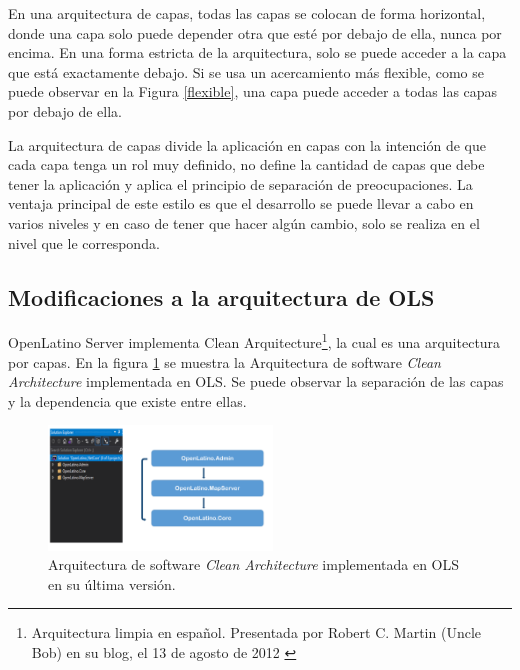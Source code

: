 En una arquitectura de capas, todas las capas se colocan de forma horizontal, donde una capa solo puede depender otra que est\'e por debajo de ella, nunca por encima. En una forma estricta de la arquitectura, solo se puede acceder a la capa que est\'a exactamente debajo. Si se usa un acercamiento m\'as flexible, como se puede observar en la Figura \ref{flexible}, una capa puede acceder a todas las capas por debajo de ella. \cite{arquitecture}

La arquitectura de capas divide la aplicaci\'on en capas con la intenci\'on de que cada capa tenga un rol muy definido, no define la cantidad de capas que debe tener la aplicaci\'on y aplica el principio de separaci\'on de preocupaciones. La ventaja principal de este estilo es que el desarrollo se puede llevar a cabo en varios niveles y en caso de tener que hacer alg\'un cambio, solo se realiza en el nivel que le corresponda.

\subsection{Modificaciones a la arquitectura de OLS}
OpenLatino Server implementa Clean Arquitecture\footnote{Arquitectura limpia en espa\~nol. Presentada por Robert C. Martin (Uncle Bob) en su blog, el 13 de agosto de 2012 \cite{cleanArquitecture}}, la cual es una arquitectura por capas.  En la figura \ref{cleanArquitecture} se muestra la Arquitectura de software \textit{Clean Architecture} implementada en OLS. Se puede observar la separaci\'on de las capas y la dependencia que existe entre ellas.

\begin{figure} 
\vspace{-20pt} 
\begin{center} 
\includegraphics[width=0.53\textwidth]{images/cleanArquitecture.png} 
\end{center} \vspace{-20pt} \caption{Arquitectura de software \textit{Clean Architecture} implementada en OLS en su \'ultima versi\'on.} \label{cleanArquitecture} \vspace{-10pt} 
\end{figure}

